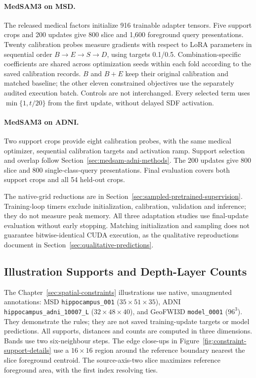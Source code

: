 \paragraph{MedSAM3 on MSD.}\label{sec:medsam-methods-details}
The released medical factors initialize 916 trainable adapter tensors.
Five support crops and 200 updates give 800 slice and 1,600 foreground
query presentations. Twenty calibration probes measure gradients with
respect to LoRA parameters in sequential order $B\to E\to S\to D$,
using targets 0.1/0.5. Combination-specific coefficients are shared
across optimization seeds within each fold according to the saved
calibration records. $B$ and $B+E$ keep their original calibration and
matched baseline; the other eleven constrained objectives use the
separately audited execution batch. Controls are not interchanged.
Every selected term uses $\min\{1,t/20\}$ from the first update,
without delayed SDF activation.

\paragraph{MedSAM3 on ADNI.}\label{sec:medsam-adni-methods-details}
Two support crops provide eight calibration probes, with the same
medical optimizer, sequential calibration targets and activation ramp.
Support selection and overlap follow
Section~\ref{sec:medsam-adni-methods}. The 200 updates give 800 slice
and 800 single-class-query presentations. Final evaluation covers both
support crops and all 54 held-out crops.

The native-grid reductions are in
Section~\ref{sec:sampled-pretrained-supervision}. Training-loop timers
exclude initialization, calibration, validation and inference; they do
not measure peak memory. All three adaptation studies use final-update
evaluation without early stopping. Matching initialization and sampling
does not guarantee bitwise-identical CUDA execution, as the qualitative
reproductions document in Section~\ref{sec:qualitative-predictions}.

\subsection{Illustration Supports and Depth-Layer Counts}
\label{sec:dataset-constraint-examples}

The Chapter~\ref{sec:spatial-constraints} illustrations use native,
unaugmented annotations: MSD \texttt{hippocampus\_001} ($35\times51\times35$),
ADNI \texttt{hippocampus\_adni\_10007\_L} ($32\times48\times40$),
and GeoFWI3D \texttt{model\_0001} ($96^3$). They demonstrate the rules;
they are not saved training-update targets or model predictions.
All supports, distances and counts are computed in three dimensions.
Bands use two six-neighbour steps. The edge close-ups in
Figure~\ref{fig:constraint-support-details} use a $16\times16$ region
around the reference boundary nearest the slice foreground centroid.
The source-axis-two slice maximizes reference foreground area, with
the first index resolving ties.

